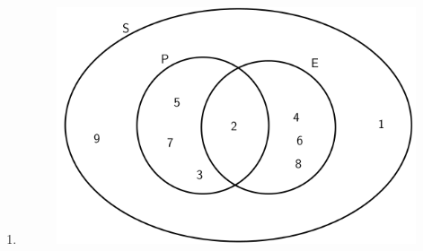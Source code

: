 {\begin{mdframed}[linewidth=4, leftmargin=40, rightmargin=40]
\begin{exercise}
\begin{enumerate}[noitemsep, label=\textbf{Step} \textbf{\arabic*}. ]
          \item  
          \label{m39377*id110666}
            
    \setcounter{subfigure}{0}


	\begin{figure}[H] %
    \begin{center}
    \label{m39377*id110668!!!underscore!!!media}\label{m39377*id110668!!!underscore!!!printimage}\includegraphics{col11306.imgs/m39377_MG10C17_003.png} %
        
      \vspace{2pt}
    \vspace{.1in}
    
    \end{center}

 \end{figure}   

    \addtocounter{footnote}{-0}
    

\end{enumerate}
\end{exercise}
\end{mdframed}}
